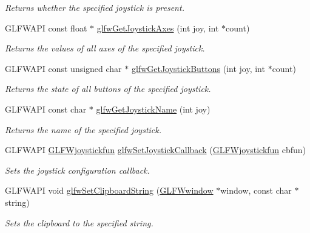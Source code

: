\begin{CompactItemize}
\begin{CompactList}\small\item\em Returns whether the specified joystick is present. \item\end{CompactList}\item 
GLFWAPI const float $\ast$ \hyperlink{group__input_gab9e573d808b088c5079c0f577d39448}{glfwGetJoystickAxes} (int joy, int $\ast$count)
\begin{CompactList}\small\item\em Returns the values of all axes of the specified joystick. \item\end{CompactList}\item 
GLFWAPI const unsigned char $\ast$ \hyperlink{group__input_g3951bea72b5fb4870b1aa0e5c2e9c903}{glfwGetJoystickButtons} (int joy, int $\ast$count)
\begin{CompactList}\small\item\em Returns the state of all buttons of the specified joystick. \item\end{CompactList}\item 
GLFWAPI const char $\ast$ \hyperlink{group__input_gc50a4fd9b01886cf9fa2c45f19191fb8}{glfwGetJoystickName} (int joy)
\begin{CompactList}\small\item\em Returns the name of the specified joystick. \item\end{CompactList}\item 
GLFWAPI \hyperlink{group__input_g488fd02f577e56f908a8f305dd226dbf}{GLFWjoystickfun} \hyperlink{group__input_g07524a1122a03642b1d28822ea931094}{glfwSetJoystickCallback} (\hyperlink{group__input_g488fd02f577e56f908a8f305dd226dbf}{GLFWjoystickfun} cbfun)
\begin{CompactList}\small\item\em Sets the joystick configuration callback. \item\end{CompactList}\item 
GLFWAPI void \hyperlink{group__input_g7a580309bbc185a0459c3559021d2fd7}{glfwSetClipboardString} (\hyperlink{group__window_g3c96d80d363e67d13a41b5d1821f3242}{GLFWwindow} $\ast$window, const char $\ast$string)
\begin{CompactList}\small\item\em Sets the clipboard to the specified string. \item\end{CompactList}\item 

\end{CompactItemize}
